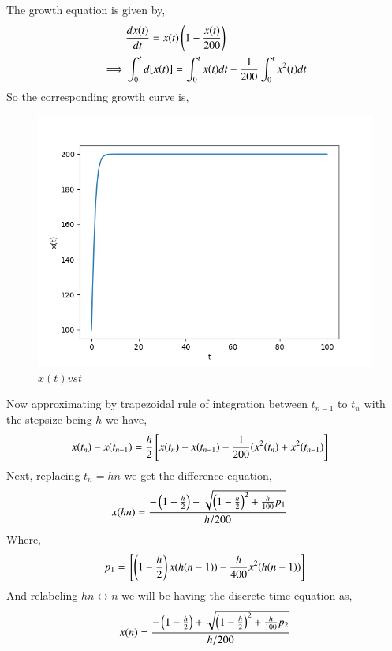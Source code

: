 \documentclass[journal,12pt,twocolumn]{IEEEtran}
\theoremstyle{remark}
\begin{document}
\solution
The growth equation is given by,
\begin{align}
    &\frac{dx(t)}{dt}=x(t)\left(1-\frac{x(t)}{200}\right) \\
    \implies &\int_{0}^{t}d[x(t)]=\int_{0}^{t}x(t)dt-\frac{1}{200}\int_{0}^{t}x^2(t)dt \\
\end{align}
So the corresponding growth curve is,
\begin{figure}[h]
    \centering
    \includegraphics[width=01.1\columnwidth]{figs/CT.png}
    \caption{$x(t) vs t$}
\end{figure}
\newline
Now approximating by trapezoidal rule of integration between $t_{n-1}$ to $t_n$ with the stepsize being $h$ we have,
\begin{align}
    &x(t_n)-x(t_{n-1})=\frac{h}{2}{}\left[x(t_n)+x(t_{n-1})-\frac{1}{200}(x^2(t_n)+x^2(t_{n-1})\right]
\end{align}
Next, replacing $t_{n}=hn$ we get the difference equation,
\begin{align}
    &x(hn)=\frac{-\left(1-\frac{h}{2}\right)+\sqrt{\left(1-\frac{h}{2}\right)^2+\frac{h}{100}p_1}}{h/200}
\end{align}
Where,
\begin{align}
    p_1={}\left[\left(1-\frac{h}{2}\right)x(h(n-1))-\frac{h}{400}x^2(h(n-1))\right]
\end{align}
And relabeling $hn\longleftrightarrow n$ we will be having the discrete time equation as,
\begin{align}
    x(n)=\frac{-\left(1-\frac{h}{2}\right)+\sqrt{\left(1-\frac{h}{2}\right)^2+\frac{h}{100}p_2}}{h/200} \label{eq:A}
\end{align}
\end{document}
